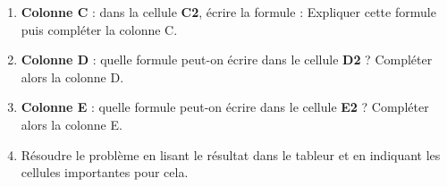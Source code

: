\begin{enumerate}
        \pf \medskip
      \item {\bf Colonne C} : dans la cellule {\bf C2}, écrire la formule :  Expliquer cette formule puis compléter la colonne C. \\
        \pf \medskip
      \item {\bf Colonne D} : quelle formule peut-on écrire dans le cellule \textbf{D2} ? Compléter alors la colonne D. \\
        \pf \medskip
      \item {\bf Colonne E} : quelle formule peut-on écrire dans le cellule \textbf{E2} ? Compléter alors la colonne E. \\
        \pf \medskip
      \item Résoudre le problème en lisant le résultat dans le tableur et en indiquant les cellules importantes pour cela. \\
        \pf
   \end{enumerate}